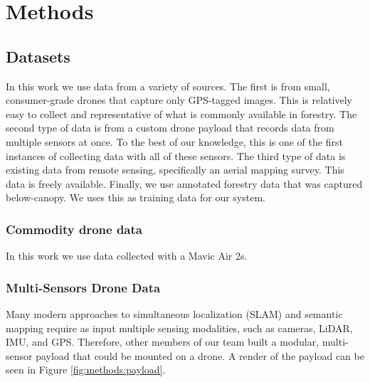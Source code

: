 \chapter{Methods} \label{chapMethod}
\section{Datasets}
In this work we use data from a variety of sources. The first is from small, consumer-grade drones that capture only GPS-tagged images. This is relatively easy to collect and representative of what is commonly available in forestry. The second type of data is from a custom drone payload that records data from multiple sensors at once. To the best of our knowledge, this is one of the first instances of collecting data with all of these sensors. The third type of data is existing data from remote sensing, specifically an aerial mapping survey. This data is freely available. Finally, we use annotated forestry data that was captured below-canopy. We uses this as training data for our system.

\subsection{Commodity drone data}

In this work we use data collected with a Mavic Air 2s.



\subsection{Multi-Sensors Drone Data}
Many modern approaches to simultaneous localization (SLAM) and semantic mapping require as input multiple sensing modalities, such as cameras, LiDAR, IMU, and GPS. Therefore, other members of our team built a modular, multi-sensor payload that could be mounted on a drone. A render of the payload can be seen in Figure \ref{fig:methods:payload}. 

